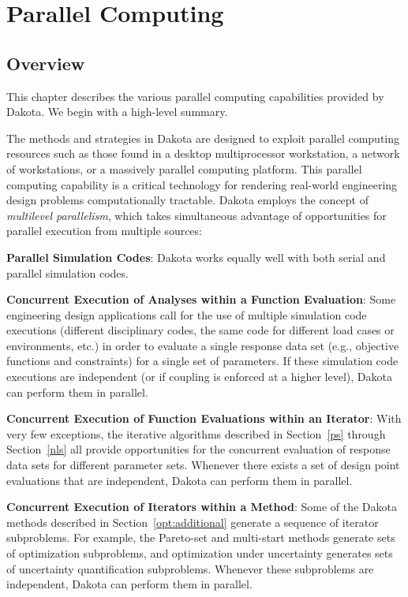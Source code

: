 \chapter{Parallel Computing}\label{parallel}

\section{Overview}\label{parallel:overview}

This chapter describes the various parallel computing capabilities
provided by Dakota.  We begin with a high-level summary.

The methods and strategies in Dakota are designed to exploit parallel
computing resources such as those found in a desktop multiprocessor
workstation, a network of workstations, or a massively parallel
computing platform. This parallel computing capability is a critical
technology for rendering real-world engineering design problems
computationally tractable. Dakota employs the concept of
\emph{multilevel parallelism}, which takes simultaneous advantage of
opportunities for parallel execution from multiple sources:

\textbf{Parallel Simulation Codes}: Dakota works equally well with both
serial and parallel simulation codes.

\textbf{Concurrent Execution of Analyses within a Function Evaluation}:
Some engineering design applications call for the use of multiple
simulation code executions (different disciplinary codes, the same
code for different load cases or environments, etc.) in order to
evaluate a single response data set (e.g., objective functions and
constraints) for a single set of parameters. If these simulation code
executions are independent (or if coupling is enforced at a higher
level), Dakota can perform them in parallel.

\textbf{Concurrent Execution of Function Evaluations within an Iterator}:
With very few exceptions, the iterative algorithms described in
Section~\ref{ps} through
Section~\ref{nls} all provide opportunities for the
concurrent evaluation of response data sets for different parameter
sets. Whenever there exists a set of design point evaluations that are
independent, Dakota can perform them in parallel.

\textbf{Concurrent Execution of Iterators within a Method}: Some of
the Dakota methods described in Section~\ref{opt:additional}
generate a sequence of iterator subproblems. For example, the
Pareto-set and multi-start methods generate sets of optimization
subproblems, and optimization under uncertainty generates sets of 
uncertainty quantification subproblems. Whenever these subproblems 
are independent, Dakota can perform them in parallel.

